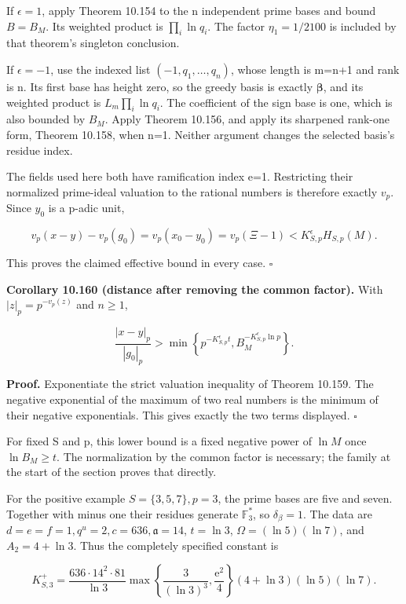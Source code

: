 \documentclass[
  11pt,
  a4paper,
]{article}
\begin{document}
If \(\epsilon=1\), apply Theorem 10.154 to the n independent prime bases
and bound \(B=B_M\). Its weighted product is \(\prod_i\ln q_i\). The
factor \(\eta_1=1/2100\) is included by that theorem's singleton
conclusion.

If \(\epsilon=-1\), use the indexed list \((-1,q_1,\ldots,q_n)\), whose
length is m=n+1 and rank is n. Its first base has height zero, so the
greedy basis is exactly \(\boldsymbol\beta\), and its weighted product
is \(L_m\prod_i\ln q_i\). The coefficient of the sign base is one, which
is also bounded by \(B_M\). Apply Theorem 10.156, and apply its
sharpened rank-one form, Theorem 10.158, when n=1. Neither argument
changes the selected basis's residue index.

The fields used here both have ramification index e=1. Restricting their
normalized prime-ideal valuation to the rational numbers is therefore
exactly \(v_p\). Since \(y_0\) is a p-adic unit,

\[
v_p(x-y)-v_p(g_0)=v_p(x_0-y_0)
=v_p(\Xi-1)<K_{S,p}^{\epsilon}H_{S,p}(M).
\tag{10.515}
\]

This proves the claimed effective bound in every case. \(\square\)

\textbf{Corollary 10.160 (distance after removing the common factor).}
With \(|z|_p=p^{-v_p(z)}\) and \(n\ge1\),

\[
\frac{|x-y|_p}{|g_0|_p}
>\min\left\{p^{-K_{S,p}^{\epsilon}t},
B_M^{-K_{S,p}^{\epsilon}\ln p}\right\}.
\tag{10.516}
\]

\textbf{Proof.} Exponentiate the strict valuation inequality of Theorem
10.159. The negative exponential of the maximum of two real numbers is
the minimum of their negative exponentials. This gives exactly the two
terms displayed. \(\square\)

For fixed S and p, this lower bound is a fixed negative power of
\(\ln M\) once \(\ln B_M\ge t\). The normalization by the common factor
is necessary; the family at the start of the section proves that
directly.

For the positive example \(S=\{3,5,7\},p=3\), the prime bases are five
and seven. Together with minus one their residues generate
\(\mathbb F_3^*\), so \(\delta_\beta=1\). The data are
\(d=e=f=1,q^u=2,c=636,\mathfrak a=14\), \(t=\ln3\),
\(\Omega=(\ln5)(\ln7)\), and \(A_2=4+\ln3\). Thus the completely
specified constant is

\[
K_{S,3}^{+}=
\frac{636\cdot14^2\cdot81}{\ln3}
\max\left\{\frac3{(\ln3)^3},\frac{\mathrm e^2}4\right\}
(4+\ln3)(\ln5)(\ln7).
\tag{10.517}
\]
\end{document}
